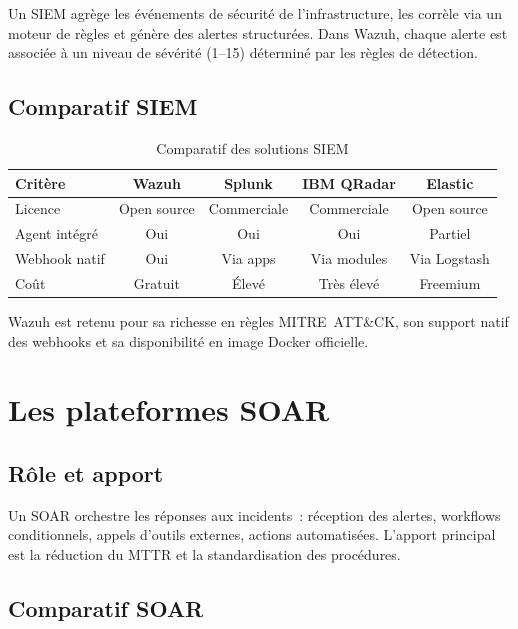 \documentclass[12pt,a4paper]{report}
\begin{document}
Un SIEM agrège les événements de sécurité de l'infrastructure, les corrèle via un moteur de règles et génère des alertes structurées. Dans Wazuh, chaque alerte est associée à un niveau de sévérité (1--15) déterminé par les règles de détection.

\subsection{Comparatif SIEM}

\begin{table}[H]
\centering
\caption{Comparatif des solutions SIEM}
\label{tab:siem}
\begin{tabular}{|l|c|c|c|c|}
\hline
\rowcolor{ColSection!15}
\textbf{Critère} & \textbf{Wazuh} & \textbf{Splunk}
  & \textbf{IBM QRadar} & \textbf{Elastic} \\
\hline
Licence       & Open source & Commerciale & Commerciale & Open source \\
Agent intégré & Oui         & Oui         & Oui         & Partiel \\
Webhook natif & Oui         & Via apps    & Via modules & Via Logstash \\
Coût          & Gratuit     & Élevé       & Très élevé  & Freemium \\
\hline
\end{tabular}
\end{table}

Wazuh est retenu pour sa richesse en règles MITRE~ATT\&CK, son support natif des webhooks et sa disponibilité en image Docker officielle.

\section{Les plateformes SOAR}

\subsection{Rôle et apport}

Un SOAR orchestre les réponses aux incidents~: réception des alertes, workflows conditionnels, appels d'outils externes, actions automatisées. L'apport principal est la réduction du MTTR et la standardisation des procédures.

\subsection{Comparatif SOAR}
\end{document}
